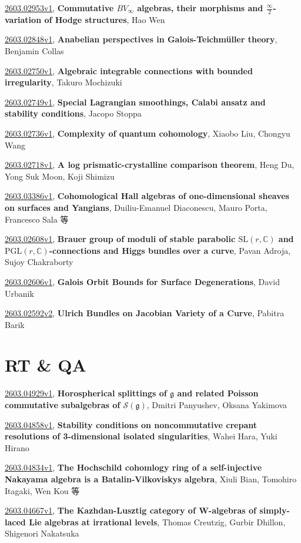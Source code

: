 \documentclass[9pt, a4paper]{article}
\theoremstyle{plain}
\theoremstyle{definition}
\theoremstyle{remark}
\newcommand{\arxiv}[3]{\href{https://arxiv.org/abs/#1}{#1}, \textbf{\textcolor{arxivblue}{#2}}, #3}
\begin{document}
\arxiv{2603.02953v1}{Commutative $BV_\infty$ algebras, their morphisms and $\frac{\infty}{2}$-variation of Hodge structures}{Hao Wen}

\arxiv{2603.02848v1}{Anabelian perspectives in Galois-Teichmüller theory}{Benjamin Collas}

\arxiv{2603.02750v1}{Algebraic integrable connections with bounded irregularity}{Takuro Mochizuki}

\arxiv{2603.02749v1}{Special Lagrangian smoothings, Calabi ansatz and stability conditions}{Jacopo Stoppa}

\arxiv{2603.02736v1}{Complexity of quantum cohomology}{Xiaobo Liu, Chongyu Wang}

\arxiv{2603.02718v1}{A log prismatic-crystalline comparison theorem}{Heng Du, Yong Suk Moon, Koji Shimizu}

\arxiv{2603.03386v1}{Cohomological Hall algebras of one-dimensional sheaves on surfaces and Yangians}{Duiliu-Emanuel Diaconescu, Mauro Porta, Francesco Sala 等}

\arxiv{2603.02608v1}{Brauer group of moduli of stable parabolic $\text{SL}(r,\mathbb{C})$ and $\text{PGL}(r,\mathbb{C})$-connections and Higgs bundles over a curve}{Pavan Adroja, Sujoy Chakraborty}

\arxiv{2603.02606v1}{Galois Orbit Bounds for Surface Degenerations}{David Urbanik}

\arxiv{2603.02592v2}{Ulrich Bundles on Jacobian Variety of a Curve}{Pabitra Barik}


\section{RT \& QA}
\arxiv{2603.04929v1}{Horospherical splittings of $\mathfrak g$ and related Poisson commutative subalgebras of $\mathcal S(\mathfrak g)$}{Dmitri Panyushev, Oksana Yakimova}

\arxiv{2603.04858v1}{Stability conditions on noncommutative crepant resolutions of 3-dimensional isolated singularities}{Wahei Hara, Yuki Hirano}

\arxiv{2603.04834v1}{The Hochschild cohomlogy ring of a self-injective Nakayama algebra is a Batalin-Vilkoviskys algebra}{Xiuli Bian, Tomohiro Itagaki, Wen Kou 等}

\arxiv{2603.04667v1}{The Kazhdan-Lusztig category of W-algebras of simply-laced Lie algebras at irrational levels}{Thomas Creutzig, Gurbir Dhillon, Shigenori Nakatsuka}
\end{document}
